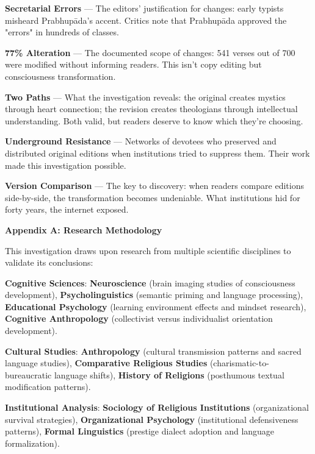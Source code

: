 \documentclass[11pt,twoside]{book}
\begin{document}
\textbf{\textbf{Secretarial Errors}} — The editors' justification for changes: early typists misheard Prabhupāda's accent. Critics note that Prabhupāda approved the "errors" in hundreds of classes.

\textbf{\textbf{77\% Alteration}} — The documented scope of changes: 541 verses out of 700 were modified without informing readers. This isn't copy editing but consciousness transformation.

\textbf{\textbf{Two Paths}} — What the investigation reveals: the original creates mystics through heart connection; the revision creates theologians through intellectual understanding. Both valid, but readers deserve to know which they're choosing.

\textbf{\textbf{Underground Resistance}} — Networks of devotees who preserved and distributed original editions when institutions tried to suppress them. Their work made this investigation possible.

\textbf{\textbf{Version Comparison}} — The key to discovery: when readers compare editions side-by-side, the transformation becomes undeniable. What institutions hid for forty years, the internet exposed.

\clearpage
\pagestyle{sectionopening}
\thispagestyle{sectionopening}
\markboth{}{}
\markright{}
\vspace*{0.25\textheight}
\begin{center}
{\Huge\bfseries Appendix A: Research Methodology}
\end{center}
\newpage

This investigation draws upon research from multiple scientific disciplines to validate its conclusions:

\textbf{\textbf{Cognitive Sciences}}: \textbf{\textbf{Neuroscience}} (brain imaging studies of consciousness development), \textbf{\textbf{Psycholinguistics}} (semantic priming and language processing), \textbf{\textbf{Educational Psychology}} (learning environment effects and mindset research), \textbf{\textbf{Cognitive Anthropology}} (collectivist versus individualist orientation development).

\textbf{\textbf{Cultural Studies}}: \textbf{\textbf{Anthropology}} (cultural transmission patterns and sacred language studies), \textbf{\textbf{Comparative Religious Studies}} (charismatic-to-bureaucratic language shifts), \textbf{\textbf{History of Religions}} (posthumous textual modification patterns).

\textbf{\textbf{Institutional Analysis}}: \textbf{\textbf{Sociology of Religious Institutions}} (organizational survival strategies), \textbf{\textbf{Organizational Psychology}} (institutional defensiveness patterns), \textbf{\textbf{Formal Linguistics}} (prestige dialect adoption and language formalization).
\end{document}
